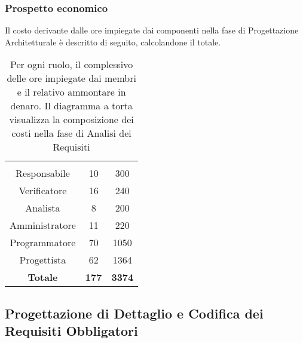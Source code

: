 \subsubsection{Prospetto economico}
Il costo derivante dalle ore impiegate dai componenti nella fase di Progettazione Architetturale è descritto di seguito, calcolandone il totale.

\begin{table}[H]
	{\setlength{\parindent}{0cm}
		\begin{minipage}{.43\textwidth}
			\begin{tabular}{ccc}
				\rowcolorhead
				\headertitle{Ruolo} & \headertitle{Ore} & \headertitle{Costo(\euro{})}\\
				Responsabile & 10 & 300\\
				Verificatore & 16 & 240\\
				Analista & 8 & 200\\
				Amministratore & 11 & 220\\
				Programmatore & 70 & 1050\\
				Progettista & 62 & 1364\\
				\hline
				\textbf{Totale} & \textbf{177} & \textbf{3374}\\
			\end{tabular}
		\end{minipage}%
		\begin{minipage}{.57\textwidth}
	\end{minipage} }
	\caption[Prospetto economico della fase di Analisi dei Requisiti]{Per ogni ruolo, il complessivo delle ore impiegate dai membri e il relativo ammontare in denaro. Il diagramma a torta visualizza la composizione dei costi nella fase di Analisi dei Requisiti}
\end{table}







\subsection{Progettazione di Dettaglio e Codifica dei Requisiti Obbligatori}



